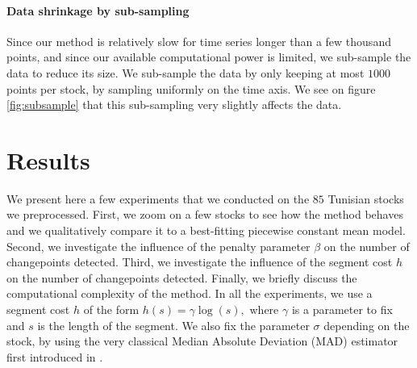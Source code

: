 \documentclass[11pt]{article}
\begin{document}
\paragraph*{Data shrinkage by sub-sampling} Since our method is relatively slow for time series longer than a few thousand points, and since our available computational power is limited, we sub-sample the data to reduce its size. We sub-sample the data by only keeping at most $1000$ points per stock, by sampling uniformly on the time axis. We see on figure \ref{fig:subsample} that this sub-sampling very slightly affects the data.

\section{Results}
We present here a few experiments that we conducted on the $85$ Tunisian stocks we preprocessed. First, we zoom on a few stocks to see how the method behaves and we qualitatively compare it to a best-fitting piecewise constant mean model. Second, we investigate the influence of the penalty parameter $\beta$ on the number of changepoints detected. Third, we investigate the influence of the segment cost $h$ on the number of changepoints detected. Finally, we briefly discuss the computational complexity of the method.
\jump
In all the experiments, we use a segment cost $h$ of the form $ h(s) = \gamma \log(s), $ where $\gamma$ is a parameter to fix and $s$ is the length of the segment. We also fix the parameter $\sigma$ depending on the stock, by using the very classical Median Absolute Deviation (MAD) estimator first introduced in \cite{hampel1974}.
\end{document}
